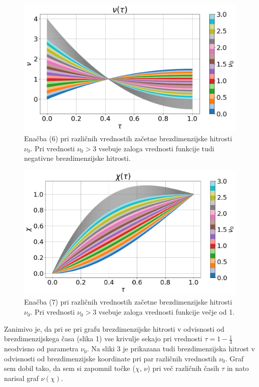 \documentclass[slovene,11pt,a4paper]{article}
\begin{document}
\begin{figure}[h!]
\centering
\includegraphics[width=\linewidth]{ZacetniProblem1.png}
\caption{Enačba (6) pri različnih vrednostih začetne brezdimenzijske hitrosti $\nu_0$. Pri vrednosti $\nu_0 > 3$ vsebuje zaloga vrednosti funkcije tudi negativne brezdimenzijske hitrosti.}
\end{figure}

\begin{figure}[h!]
\centering
\includegraphics[width=\linewidth]{ZacetniProblem2.png}
\caption{Enačba (7) pri različnih vrednostih začetne brezdimenzijske hitrosti $\nu_0$. Pri vrednosti $\nu_0 > 3$ vsebuje zaloga vrednosti funkcije večje od 1.}
\end{figure}

Zanimivo je, da pri se pri grafu brezdimenzijske hitrosti v odvisnosti od brezdimenzijskega časa (slika 1) vse krivulje sekajo pri vrednosti $\tau = 1 - \frac{1}{3}$ neodvisno od parametra $\nu_0$. Na sliki 3 je prikazana tudi brezdimenzijska hitrost v odvisnosti od brezdimenzijske koordinate pri par različnih vrednostih $\nu_0$. Graf sem dobil tako, da sem si zapomnil točke ($\chi$, $\nu$) pri več različnih časih $\tau$ in nato narisal graf $\nu(\chi)$.
\end{document}
